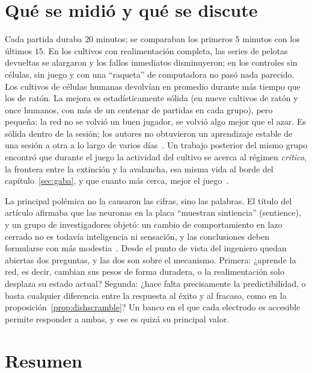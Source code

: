 \section{Qué se midió y qué se discute}

Cada partida duraba $20$ minutos; se comparaban los primeros $5$ minutos con los últimos $15$. En los cultivos con realimentación completa, las series de pelotas devueltas se alargaron y los fallos inmediatos disminuyeron; en los controles sin células, sin juego y con una “raqueta” de computadora no pasó nada parecido. Los cultivos de células humanas devolvían en promedio durante más tiempo que los de ratón. La mejora es estadísticamente sólida (en nueve cultivos de ratón y once humanos, con más de un centenar de partidas en cada grupo), pero pequeña: la red no se volvió un buen jugador, se volvió algo mejor que el azar. Es sólida dentro de la sesión; los autores no obtuvieron un aprendizaje estable de una sesión a otra a lo largo de varios días~\cite{Kagan2022}. Un trabajo posterior del mismo grupo encontró que durante el juego la actividad del cultivo se acerca al régimen \emph{crítico}, la frontera entre la extinción y la avalancha, esa misma vida al borde del capítulo~\ref{sec:gaba}, y que cuanto más cerca, mejor el juego~\cite{Habibollahi2023}.

La principal polémica no la causaron las cifras, sino las palabras. El título del artículo afirmaba que las neuronas en la placa “muestran sintiencia” (sentience), y un grupo de investigadores objetó: un cambio de comportamiento en lazo cerrado no es todavía inteligencia ni sensación, y las conclusiones deben formularse con más modestia~\cite{Balci2023}. Desde el punto de vista del ingeniero quedan abiertas dos preguntas, y las dos son sobre el mecanismo. Primera: ¿aprende la red, es decir, cambian sus pesos de forma duradera, o la realimentación solo desplaza su estado actual? Segunda: ¿hace falta precisamente la predictibilidad, o basta cualquier diferencia entre la respuesta al éxito y al fracaso, como en la proposición~\ref{prop:dishscramble}? Un banco en el que cada electrodo es accesible permite responder a ambas, y ese es quizá su principal valor.



\section{Resumen}

